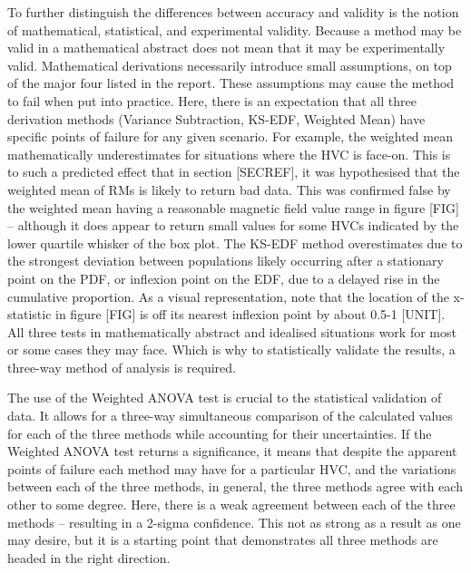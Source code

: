 To further distinguish the differences between accuracy and validity is the notion of mathematical, statistical, and experimental validity. Because a method may be valid in a mathematical abstract does not mean that it may be experimentally valid. Mathematical derivations necessarily introduce small assumptions, on top of the major four listed in the report. These assumptions may cause the method to fail when put into practice. Here, there is an expectation that all three derivation methods (Variance Subtraction, KS-EDF, Weighted Mean) have specific points of failure for any given scenario. For example, the weighted mean mathematically underestimates for situations where the HVC is face-on. This is to such a predicted effect that in section [SECREF], it was hypothesised that the weighted mean of RMs is likely to return bad data. This was confirmed false by the weighted mean having a reasonable magnetic field value range in figure [FIG] – although it does appear to return small values for some HVCs indicated by the lower quartile whisker of the box plot. The KS-EDF method overestimates due to the strongest deviation between populations likely occurring after a stationary point on the PDF, or inflexion point on the EDF, due to a delayed rise in the cumulative proportion. As a visual representation, note that the location of the x-statistic in figure [FIG] is off its nearest inflexion point by about 0.5-1 [UNIT]. All three tests in mathematically abstract and idealised situations work for most or some cases they may face. Which is why to statistically validate the results, a three-way method of analysis is required.


The use of the Weighted ANOVA test is crucial to the statistical validation of data. It allows for a three-way simultaneous comparison of the calculated values for each of the three methods while accounting for their uncertainties. If the Weighted ANOVA test returns a significance, it means that despite the apparent points of failure each method may have for a particular HVC, and the variations between each of the three methods, in general, the three methods agree with each other to some degree. Here, there is a weak agreement between each of the three methods – resulting in a 2-sigma confidence. This not as strong as a result as one may desire, but it is a starting point that demonstrates all three methods are headed in the right direction.


